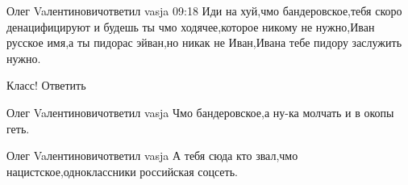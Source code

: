  
 
 
 
 

Олег Vaлентиновичответил vasja
09:18
Иди на хуй,чмо бандеровское,тебя скоро денацифицируют и будешь ты чмо ходячее,которое никому не нужно,Иван русское имя,а ты пидорас эйван,но никак не Иван,Ивана тебе пидору заслужить нужно.

    Класс!
    Ответить

Олег Vaлентиновичответил vasja
Чмо бандеровское,а ну-ка молчать и в окопы геть.

Олег Vaлентиновичответил vasja
А тебя сюда кто звал,чмо нацистское,одноклассники российская соцсеть.
